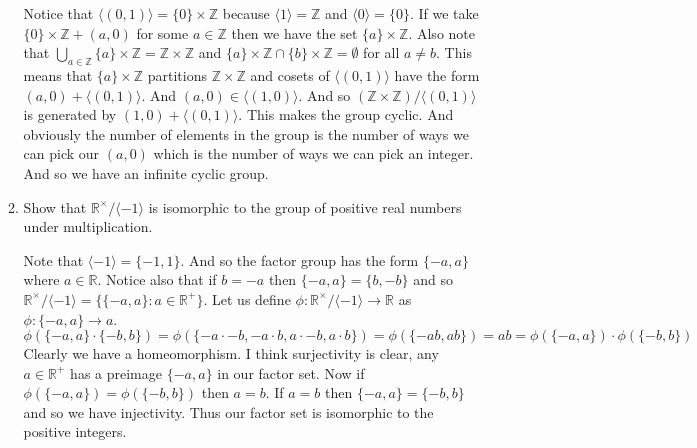 \documentclass[letterpaper]{article}
\begin{document}
\begin{enumerate}
\begin{enumerate}
    Notice that $\langle (0,1)\rangle=\{0\}\times \mathbb{Z}$ because $\langle 1\rangle=\mathbb{Z}$ and $\langle 0\rangle=\{0\}$.
    If we take $\{0\}\times \mathbb{Z}+(a,0)$ for some $a\in \mathbb{Z}$ then we have the set $\{a\}\times \mathbb{Z}$. Also note that $\bigcup\limits_{a\in \mathbb{Z}}\{a\}\times \mathbb{Z}=\mathbb{Z}\times\mathbb{Z}$ and $\{a\}\times\mathbb{Z}\cap\{b\}\times \mathbb{Z}=\emptyset$ for all $a\ne b$. This means that $\{a\}\times\mathbb{Z}$ partitions $\mathbb{Z}\times\mathbb{Z}$ and cosets of $\langle(0,1)\rangle$ have the form $(a,0)+\langle(0,1)\rangle$. And $(a,0)\in \langle(1,0)\rangle$. And so $(\mathbb{Z}\times\mathbb{Z})/\langle(0,1)\rangle$ is generated by  $(1,0)+\langle(0,1)\rangle$. This makes the group cyclic. And obviously the number of elements in the group is the number of ways we can pick our $(a,0)$ which is the number of ways we can pick an integer. And so we have an infinite cyclic group. 
  \setcounter{enumii}{21}
  \item
    Show that $\mathbb{R}^\times/\langle-1\rangle$ is isomorphic to the group of positive real numbers under multiplication.

    Note that $\langle -1\rangle=\{-1,1\}$.
    And so the factor group has the form $\{-a,a\}$ where $a\in \mathbb{R}$.
    Notice also that if $b=-a$ then $\{-a,a\}=\{b,-b\}$ and so $\mathbb{R}^{\times}/\langle -1\rangle=\{\{-a,a\}:a\in \mathbb{R}^+\}$.
    Let us define $\phi:\mathbb{R}^{\times}/\langle -1\rangle\to\mathbb{R}$ as $\phi:\{-a,a\}\to a$.
    \[\phi(\{-a,a\}\cdot\{-b,b\})=\phi(\{-a\cdot-b,-a\cdot b,a\cdot -b,a\cdot b\})=\phi(\{-ab,ab\})=ab=\phi(\{-a,a\})\cdot\phi(\{-b,b\})\]
    Clearly we have a homeomorphism.
    I think surjectivity is clear, any $a\in \mathbb{R}^{+}$ has a preimage $\{-a,a\}$ in our factor set. Now if $\phi(\{-a,a\})=\phi(\{-b,b\})$ then $a=b$. If $a=b$ then $\{-a,a\}=\{-b,b\}$ and so we have injectivity. Thus our factor set is isomorphic to the positive integers.
  \end{enumerate}
\end{enumerate}
\end{document}
